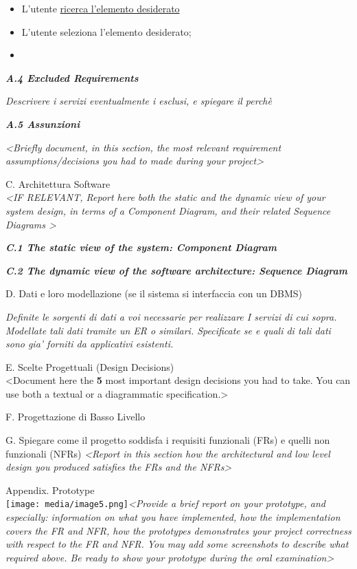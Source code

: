 \documentclass[a4paper,12pt]{report}
\begin{document}
\begin{itemize}
  \item
    L'utente \ul{ricerca l'elemento desiderato}
  \item
    L'utente seleziona l'elemento desiderato;
  \item
\end{itemize}

\emph{\textbf{A.4 Excluded Requirements}}

\emph{Descrivere i servizi eventualmente i esclusi, e spiegare il
perchè}

\emph{\textbf{A.5 Assunzioni}}

\emph{\textless Briefly document, in this section, the most relevant
  requirement assumptions/decisions you had to made during your
project\textgreater{}}

C. Architettura Software\\
\emph{\textless IF RELEVANT, Report here both the static and the dynamic
  view of your system design, in terms of a Component Diagram, and their
related Sequence Diagrams \textgreater{}}

\emph{\textbf{C.1 The static view of the system: Component Diagram}}

\emph{\textbf{C.2 The dynamic view of the software architecture:
Sequence Diagram}}

D. Dati e loro modellazione (se il sistema si interfaccia con un DBMS)

\emph{Definite le sorgenti di dati a voi necessarie per realizzare I
  servizi di cui sopra. Modellate tali dati tramite un ER o similari.
  Specificate se e quali di tali dati sono gia' forniti da applicativi
esistenti.}

E. Scelte Progettuali (Design Decisions)\\
\textless Document here the \textbf{5} most important design decisions
you had to take. You can use both a textual or a diagrammatic
specification.\textgreater{}

F. Progettazione di Basso Livello

G. Spiegare come il progetto soddisfa i requisiti funzionali (FRs) e
quelli non funzionali (NFRs) \emph{\textless Report in this section how
  the architectural and low level design you produced satisfies the FRs
and the NFRs\textgreater{}}

Appendix. Prototype\\
\texttt{[image: media/image5.png]}\emph{\textless Provide
  a brief report on your prototype, and especially: information on what
  you have implemented, how the implementation covers the FR and NFR, how
  the prototypes demonstrates your project correctness with respect to the
  FR and NFR. You may add some screenshots to describe what required
  above. Be ready to show your prototype during the oral
examination\textgreater{}}
\end{document}

